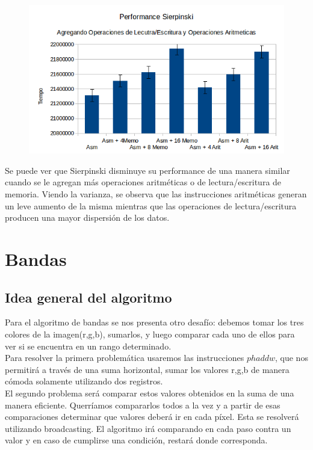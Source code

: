 \documentclass[a4paper]{article}
\begin{document}
\begin{figure}[h!]
  \begin{center}
  \includegraphics[scale=0.66]{Graficos1.5/sie/per.png}
  \label{nombreparareferenciar1}
  \end{center}
\end{figure}

Se puede ver que Sierpinski disminuye su performance de una manera similar cuando se le agregan más operaciones aritméticas o de lectura/escritura de memoria. Viendo la varianza, se observa que las instrucciones aritméticas generan un leve aumento de la misma mientras que las operaciones de lectura/escritura producen una mayor dispersión de los datos.
\newpage
\section{Bandas}
\subsection{Idea general del algoritmo}
Para el algoritmo de bandas se nos presenta otro desafío: debemos tomar los tres colores de la imagen(r,g,b), sumarlos, y luego comparar cada uno de ellos para ver si se encuentra en un rango determinado.
\\
Para resolver la primera problemática usaremos las instrucciones $phaddw$, que nos permitirá a través de una suma horizontal, sumar los valores r,g,b de manera cómoda solamente utilizando dos registros.
\\
El segundo problema será comparar estos valores obtenidos en la suma de una manera eficiente. Querríamos compararlos todos a la vez y a partir de esas comparaciones determinar que valores deberá ir en cada píxel. Esta se resolverá utilizando broadcasting. El algoritmo irá comparando en cada paso contra un valor y en caso de cumplirse una condición, restará donde corresponda.
\end{document}
